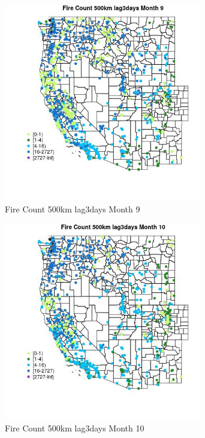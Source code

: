 \begin{figure} 
\centering  
\includegraphics[width=0.77\textwidth]{Code_Outputs/Report_ML_input_PM25_Step4_part_f_de_duplicated_aves_prioritize_24hr_obswNAs_MapObsMo9Fire_Count_500km_lag3days.jpg} 
\caption{\label{fig:Report_ML_input_PM25_Step4_part_f_de_duplicated_aves_prioritize_24hr_obswNAsMapObsMo9Fire_Count_500km_lag3days}Fire Count 500km lag3days Month 9} 
\end{figure} 
 

\begin{figure} 
\centering  
\includegraphics[width=0.77\textwidth]{Code_Outputs/Report_ML_input_PM25_Step4_part_f_de_duplicated_aves_prioritize_24hr_obswNAs_MapObsMo10Fire_Count_500km_lag3days.jpg} 
\caption{\label{fig:Report_ML_input_PM25_Step4_part_f_de_duplicated_aves_prioritize_24hr_obswNAsMapObsMo10Fire_Count_500km_lag3days}Fire Count 500km lag3days Month 10} 
\end{figure} 
 

